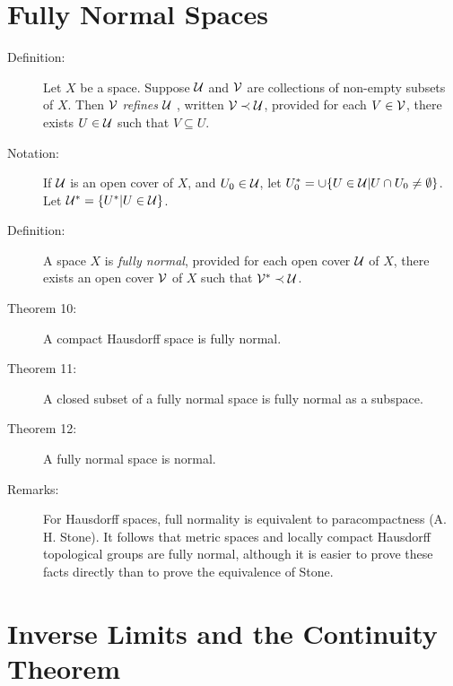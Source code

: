 \documentclass{article}
\begin{document}
\section{Fully Normal Spaces}

\begin{description}

\item[Definition:] Let $X$ be a space. Suppose ${\cal U}$ and ${\cal V}$ are collections of non-empty subsets of $X$. Then ${\cal V}$ \emph{refines} ${\cal U}$ , written ${\cal V} \prec {\cal U}$, provided for each $V \in {\cal V}$, there exists $U \in {\cal U}$ such that $V \subseteq U$.

\item[Notation:] If ${\cal U}$ is an open cover of $X$, and $U_0 \in {\cal U}$, let $U_0^* = \cup \{ U \in {\cal U} \vert U \cap U_0 \neq \emptyset \}$. Let ${\cal U}^* = \{ U^* \vert U \in {\cal U} \}$.

\item[Definition:] A space $X$ is \emph{fully normal}, provided for each  open cover ${\cal U}$ of $X$, there exists an open cover ${\cal V}$ of $X$ such that ${\cal V}^* \prec {\cal U}$.

\item[Theorem 10:] A compact Hausdorff space is fully normal.

\item[Theorem 11:] A closed subset of a fully normal space is fully normal as a subspace.

\item[Theorem 12:] A fully normal space is normal.

\item[Remarks:] For Hausdorff spaces, full normality is equivalent to paracompactness (A. H. Stone). It follows that metric spaces and locally compact Hausdorff topological groups are fully normal, although it is easier to prove these facts directly than to prove the equivalence of Stone.

\end{description}



\section{Inverse Limits and the Continuity Theorem}
\end{document}
